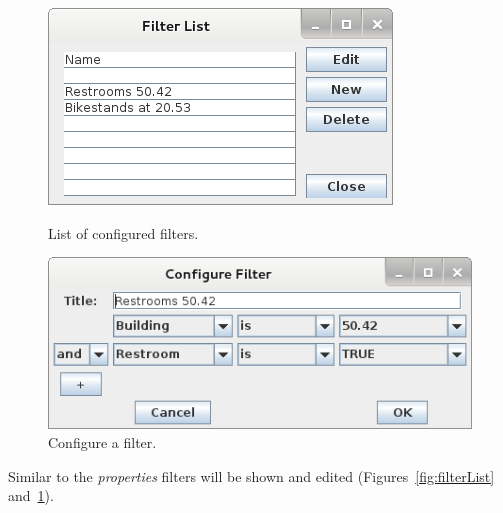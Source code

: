 \begin{figure}[h!]
\begin{minipage}[hbt]{8cm}
	\centering
	\includegraphics[scale=0.5]{gui-pictures/FilterList.png}
	\caption{List of configured filters.}
        \label{fig:filterList}
\end{minipage}
\hfill
\begin{minipage}[hbt]{8cm}
	\centering
	\includegraphics[scale=0.5]{gui-pictures/FilterConfig.png}
	\caption{Configure a filter.}
        \label{fig:filterConfig}
\end{minipage}
\end{figure}

Similar to the \textit{properties} filters will be shown and edited (Figures~\ref{fig:filterList} and~\ref{fig:filterConfig}).

